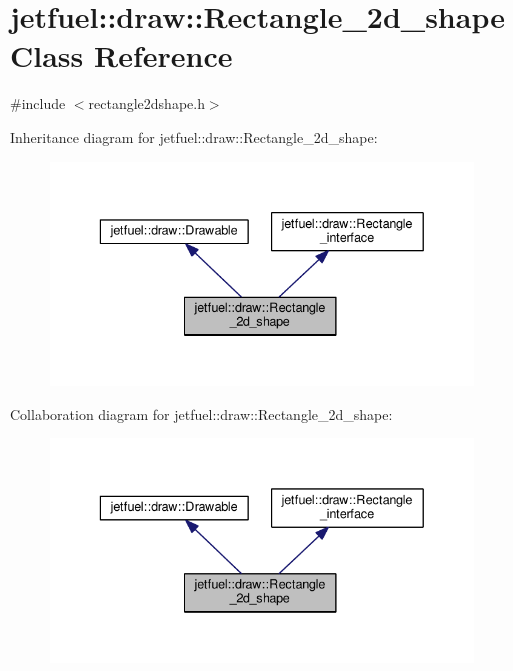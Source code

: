 \hypertarget{classjetfuel_1_1draw_1_1Rectangle__2d__shape}{}\section{jetfuel\+:\+:draw\+:\+:Rectangle\+\_\+2d\+\_\+shape Class Reference}
\label{classjetfuel_1_1draw_1_1Rectangle__2d__shape}


{\ttfamily \#include $<$rectangle2dshape.\+h$>$}



Inheritance diagram for jetfuel\+:\+:draw\+:\+:Rectangle\+\_\+2d\+\_\+shape\+:
\nopagebreak
\begin{figure}[H]
\begin{center}
\leavevmode
\includegraphics[width=336pt]{classjetfuel_1_1draw_1_1Rectangle__2d__shape__inherit__graph}
\end{center}
\end{figure}


Collaboration diagram for jetfuel\+:\+:draw\+:\+:Rectangle\+\_\+2d\+\_\+shape\+:
\nopagebreak
\begin{figure}[H]
\begin{center}
\leavevmode
\includegraphics[width=336pt]{classjetfuel_1_1draw_1_1Rectangle__2d__shape__coll__graph}
\end{center}
\end{figure}
